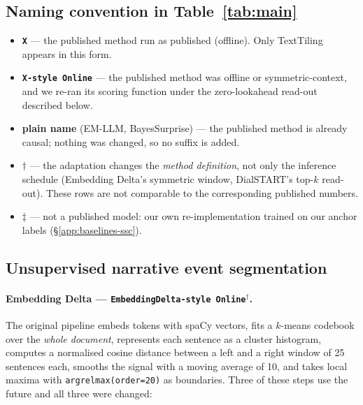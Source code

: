 \subsection{Naming convention in Table~\ref{tab:main}}
\label{app:baselines-naming}

\begin{itemize}\itemsep2pt
\item \textbf{\texttt{X}} --- the published method run as published
      (offline). Only TextTiling appears in this form.
\item \textbf{\texttt{X-style Online}} --- the published method was offline or
      symmetric-context, and we re-ran its scoring function under the
      zero-lookahead read-out described below.
\item \textbf{plain name} (EM-LLM, BayesSurprise) --- the published method is
      already causal; nothing was changed, so no suffix is added.
\item $\dagger$ --- the adaptation changes the \emph{method definition}, not
      only the inference schedule (Embedding Delta's symmetric window,
      DialSTART's top-$k$ read-out). These rows are not comparable to the
      corresponding published numbers.
\item $\ddagger$ --- not a published model: our own re-implementation trained on
      our anchor labels (\S\ref{app:baselines-ssc}).
\end{itemize}

\subsection{Unsupervised narrative event segmentation}
\label{app:baselines-nes-unsup}

\paragraph{Embedding Delta \citep{schneider2021detecting} ---
\texttt{EmbeddingDelta-style Online}$^{\dagger}$.}
The original pipeline embeds tokens with spaCy vectors, fits a $k$-means
codebook over the \emph{whole document}, represents each sentence as a cluster
histogram, computes a normalised cosine distance between a left and a right
window of 25 sentences each, smooths the signal with a moving average of 10, and
takes local maxima with \texttt{argrelmax(order=20)} as boundaries. Three of
these steps use the future and all three were changed:

